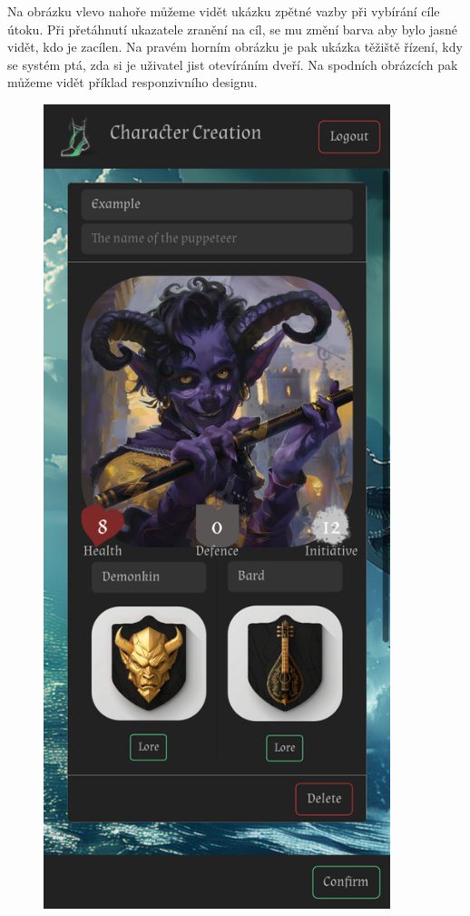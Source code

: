 Na obrázku vlevo nahoře můžeme vidět ukázku zpětné vazby při vybírání cíle útoku. Při přetáhnutí ukazatele zranění na cíl, se mu změní barva aby bylo jasné vidět, kdo je zacílen. Na pravém horním obrázku je pak ukázka těžiště řízení, kdy se systém ptá, zda si je uživatel jist otevíráním dveří. Na spodních obrázcích pak můžeme vidět příklad responzivního designu.

\begin{figure}[H]
  \begin{minipage}{0.3\textwidth}
    \centering
    \includegraphics[width=0.9\textwidth]{resources/figures/example5.png}

\end{minipage}
\end{figure}
